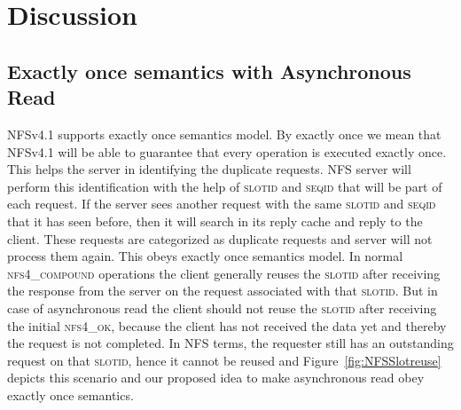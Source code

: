 \section{Discussion}
\subsection{Exactly once semantics with Asynchronous Read}

	NFSv4.1 supports exactly once semantics model. By exactly once we mean that NFSv4.1 will be able to guarantee that every operation is executed exactly once. This helps the server in identifying the duplicate requests. NFS server will perform this identification with the help of \textsc{slotid} and \textsc{seqid} that will be part of each request. If the server sees another request with the same \textsc{slotid} and \textsc{seqid} that it has seen before, then it will search in  its reply cache and reply to the client. These requests are categorized as duplicate requests and server will not process them again. This obeys exactly once semantics model. In normal \textsc{nfs4\_compound} operations the client generally reuses the \textsc{slotid} after receiving the response from the server on the request associated with that \textsc{slotid}. But in case of asynchronous read the client should not reuse the \textsc{slotid} after receiving the initial \textsc{nfs4\_ok}, because the client has not received the data yet and thereby the request is not completed. In NFS terms, the requester still has an outstanding request on that \textsc{slotid}, hence it cannot be reused and Figure~\ref{fig:NFSSlotreuse} depicts this scenario and our proposed idea to make asynchronous read obey exactly once semantics.